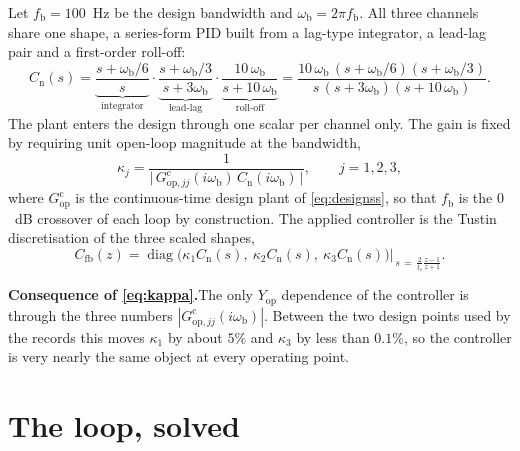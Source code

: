 \documentclass[11pt]{article}
\newcommand{\diag}{\operatorname{diag}}
\newcommand{\Cfb}{C_{\mathrm{fb}}}
\newcommand{\Cnorm}{C_{\mathrm{n}}}
\begin{document}
Let $f_{\mathrm{b}} = 100$~Hz be the design bandwidth and $\omega_{\mathrm{b}} = 2\pi
f_{\mathrm{b}}$. All three channels share one shape, a series-form PID built from a lag-type
integrator, a lead-lag pair and a first-order roll-off:
\begin{equation}
  \Cnorm(s) =
  \underbrace{\frac{s + \omega_{\mathrm{b}}/6}{s}}_{\text{integrator}} \cdot
  \underbrace{\frac{s + \omega_{\mathrm{b}}/3}{s + 3\omega_{\mathrm{b}}}}_{\text{lead-lag}} \cdot
  \underbrace{\frac{10\,\omega_{\mathrm{b}}}{s + 10\,\omega_{\mathrm{b}}}}_{\text{roll-off}}
  = \frac{10\,\omega_{\mathrm{b}}\,(s + \omega_{\mathrm{b}}/6)(s + \omega_{\mathrm{b}}/3)}
         {s\,(s + 3\omega_{\mathrm{b}})(s + 10\,\omega_{\mathrm{b}})} .
  \label{eq:cnorm}
\end{equation}
The plant enters the design through one scalar per channel only. The gain is fixed by requiring
unit open-loop magnitude at the bandwidth,
\begin{equation}
  \kappa_j = \frac{1}{\big|\,G^{\mathrm{c}}_{\mathrm{op},jj}(i\omega_{\mathrm{b}})\,
                       \Cnorm(i\omega_{\mathrm{b}})\,\big|} ,
  \qquad j = 1,2,3 ,
  \label{eq:kappa}
\end{equation}
where $G^{\mathrm{c}}_{\mathrm{op}}$ is the continuous-time design plant of \eqref{eq:designss}, so that
$f_{\mathrm{b}}$ is the $0$~dB crossover of each loop by construction. The applied controller is
the Tustin discretisation of the three scaled shapes,
\begin{equation}
  \Cfb(z) = \diag\big(\kappa_1\Cnorm(s),\ \kappa_2\Cnorm(s),\ \kappa_3\Cnorm(s)\big)
  \Big|_{\,s \,=\, \frac{2}{t_s}\frac{z-1}{z+1}} .
  \label{eq:cfb}
\end{equation}

\medskip\noindent\textbf{Consequence of \eqref{eq:kappa}.}\quad The only $Y_{\mathrm{op}}$
dependence of the controller is through the three numbers $|G^{\mathrm{c}}_{\mathrm{op},jj}
(i\omega_{\mathrm{b}})|$. Between the two design points used by the records this moves $\kappa_1$
by about $5\%$ and $\kappa_3$ by less than $0.1\%$, so the controller is very nearly the same
object at every operating point.

\section{The loop, solved}
\label{sec:loop}
\end{document}
